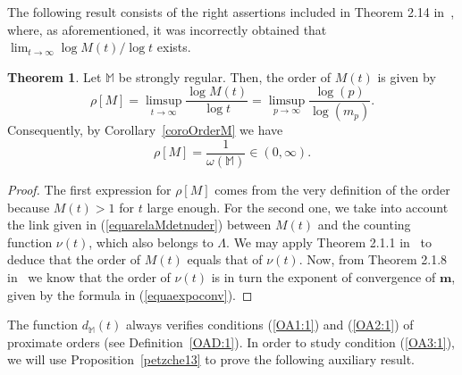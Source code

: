 \documentclass[11pt,a4paper]{article}
\theoremstyle{definition}
\newtheorem{theo}{Theorem}[section]
\def\M{\mathbb{M}}
\def\m{\boldsymbol{m}}
\def\bm{\boldsymbol{m}}
\begin{document}
The following result consists of the right assertions included in Theorem 2.14 in~\cite{SanzFlat}, where, as aforementioned, it was incorrectly obtained that $\lim_{t\to\infty}\log M(t)/\log t$ exists.

\begin{theo} %
Let $\M$ be strongly regular. %
Then, the order of $M(t)$ is given by
\begin{equation}\label{equaordeMdet}
\rho[M]=\limsup_{t\to\infty}\frac{\log M(t)}{\log t}=\limsup_{p\to\infty}\frac{\log(p)}{\log(m_{p})}.
\end{equation}
Consequently, by Corollary~\ref{coroOrderM} we have
\begin{equation*}
\rho[M]=\frac{1}{\omega(\M)}\in(0,\infty).
\end{equation*}
\end{theo}

\begin{proof}
The first expression for $\rho[M]$ comes from the very definition of the order because $M(t)>1$ for $t$ large enough.
 For the second one, %
we take into account the link given in (\ref{equarelaMdetnuder}) between $M(t)$ and  the counting function $\nu(t)$, %
which also belongs to $\Lambda$. We may apply Theorem 2.1.1 in~\cite{GoldbergOstrowskii} to deduce that the order of $M(t)$ equals that of $\nu(t)$.
Now, from Theorem 2.1.8 in~\cite{GoldbergOstrowskii} we know that the order of $\nu(t)$ is in turn the exponent of convergence of $\bm$, given by the formula in (\ref{equaexpoconv}).
\end{proof}



The function $d_{\M}(t)$ always verifies conditions (\ref{OA1:1}) and (\ref{OA2:1}) of proximate orders (see Definition~\ref{OAD:1}).
In order to study condition (\ref{OA3:1}), we will use Proposition~\ref{petzche13} to prove the following auxiliary result.
\end{document}
